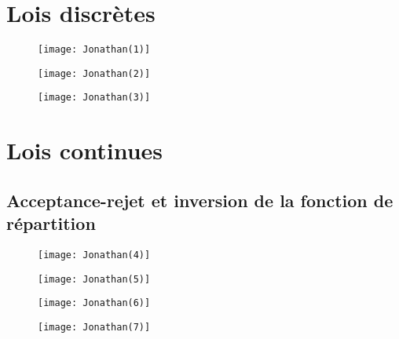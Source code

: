 \section{Lois discrètes}
\begin{figure}[H]
    \texttt{[image: Jonathan(1)]}
\end{figure}
\begin{figure}[H]
    \texttt{[image: Jonathan(2)]}
\end{figure}
\begin{figure}[H]
    \texttt{[image: Jonathan(3)]}
\end{figure}
\section{Lois continues}
\subsection{Acceptance-rejet et inversion de la fonction de répartition}
\begin{figure}[H]
    \texttt{[image: Jonathan(4)]}
\end{figure}
\begin{figure}[H]
    \texttt{[image: Jonathan(5)]}
\end{figure}
\begin{figure}[H]
    \texttt{[image: Jonathan(6)]}
\end{figure}
\begin{figure}[H]
    \texttt{[image: Jonathan(7)]}
\end{figure}